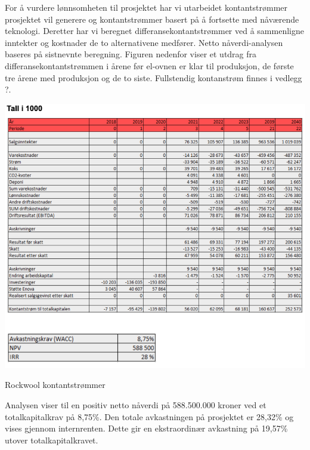 For å vurdere lønnsomheten til prosjektet har vi utarbeidet kontantstrømmer prosjektet vil generere og kontantstrømmer basert på å fortsette med nåværende teknologi. Deretter har vi beregnet differansekontantstrømmer ved å sammenligne inntekter og kostnader de to alternativene medfører. Netto nåverdi-analysen baseres på sistnevnte beregning. Figuren nedenfor viser et utdrag fra differansekontantstrømmen i årene før el-ovnen er klar til produksjon, de første tre årene med produksjon og de to siste. Fullstendig kontanstrøm finnes i vedlegg ?.

\begin{table}[H]
  \includegraphics[width=\linewidth]{tabeller/lonnsomhet.png}
  \caption{Rockwool kontantstrømmer}
  \label{tbl:lonnsomhet}
\end{table}

Analysen viser til en positiv netto nåverdi på 588.500.000 kroner ved et totalkapitalkrav på 8,75\%. Den totale avkastningen på prosjektet er 28,32\% og vises gjennom internrenten. Dette gir en ekstraordinær avkastning på 19,57\% utover totalkapitalkravet.